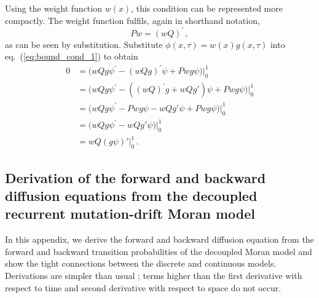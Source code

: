 \documentclass[preprint]{elsarticle}
\begin{document}
Using the weight function $w(x)$, this condition can be represented more compactly. The weight function fulfils, again in shorthand notation, 
\begin{equation}
Pw=(wQ)^{'}\,,
\end{equation}
as can be seen by substitution. Substitute $\phi(x,\tau)=w(x)g(x,\tau)$ into eq.~(\ref{eq:bound_cond_1}) to obtain
\begin{equation}\label{eq:bound_cond_2}
\begin{split}
0&=\big(w Q g\psi^{'}-(w Q g)^{'}\psi+P w g\psi\big)\big|_0^1\\
&=\big(w Q g\psi^{'}-((w Q)^{'}g+w Q g')\psi+P w g\psi\big)\big|_0^1\\
&=\big(w Q g\psi^{'}-Pwg\psi-w Q g'\psi+P w g\psi\big)\big|_0^1\\
&=\big(w Q g\psi^{'}-w Qg'\psi\big)\big|_0^1\\
&=w Q(g\psi)'\big|_0^1\,.
\end{split}
\end{equation}

\subsection{Derivation of the forward and backward diffusion equations from the decoupled recurrent mutation-drift Moran model}
\label{section:diffDer}

In this appendix, we derive the forward and backward diffusion equation from the forward and backward transition probabilities of the decoupled Moran model and show the tight connections between the discrete and continuous models. Derivations are simpler than usual \citep{Ewen04}; terms higher than the first derivative with respect to time and second derivative with respect to space do not occur. 
\end{document}
